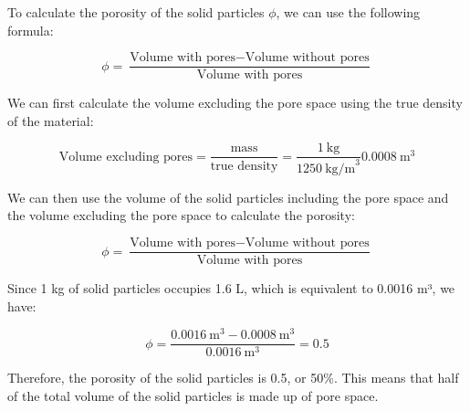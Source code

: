 \documentclass[../Article_Model_Parameters.tex]{subfiles}
\begin{document}
	
	To calculate the porosity of the solid particles $\phi$, we can use the following formula:

    {\footnotesize
        \begin{equation}
            \phi = \dfrac{\text{Volume with pores} - \text{Volume without pores}}{\text{Volume with pores}}
        \end{equation}
    }

    We can first calculate the volume excluding the pore space using the true density of the material:

    {\footnotesize
        \begin{equation}
            \text{Volume excluding pores} = \dfrac{\text{mass}}{\text{true density}} = \dfrac{1\ \text{kg}}{1250\ \text{kg/m}^3} 0.0008\ \text{m}^3
        \end{equation}
    }
    
    We can then use the volume of the solid particles including the pore space and the volume excluding the pore space to calculate the porosity:

    {\footnotesize
        \begin{equation}
            \phi = \dfrac{\text{Volume with pores} - \text{Volume without pores}}{\text{Volume with pores}}   
        \end{equation}
    }
    
    Since 1 kg of solid particles occupies 1.6 L, which is equivalent to 0.0016 m³, we have:

    {\footnotesize
        \begin{equation}
            \phi = \dfrac{0.0016\ \text{m}^3 - 0.0008\ \text{m}^3}{0.0016\ \text{m}^3} = 0.5
        \end{equation}
    }
    
    Therefore, the porosity of the solid particles is 0.5, or 50\%. This means that half of the total volume of the solid particles is made up of pore space.
	
\end{document}
